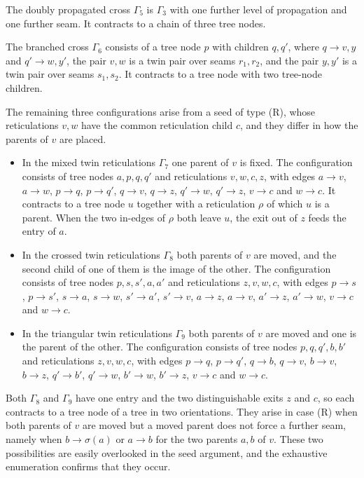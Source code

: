 \documentclass[11pt,a4paper]{article}
\theoremstyle{definition}
\begin{document}
The doubly propagated cross $\Gamma_5$ is $\Gamma_3$ with one further level of propagation and one further seam. It contracts to a chain of three tree nodes.

The branched cross $\Gamma_6$ consists of a tree node $p$ with children $q,q'$, where $q\to v,y$ and $q'\to w,y'$, the pair $v,w$ is a twin pair over seams $r_1,r_2$, and the pair $y,y'$ is a twin pair over seams $s_1,s_2$. It contracts to a tree node with two tree-node children.

The remaining three configurations arise from a seed of type (R), whose reticulations $v,w$ have the common reticulation child $c$, and they differ in how the parents of $v$ are placed.

\begin{itemize}
\item In the mixed twin reticulations $\Gamma_7$ one parent of $v$ is fixed. The configuration consists of tree nodes $a,p,q,q'$ and reticulations $v,w,c,z$, with edges $a\to v$, $a\to w$, $p\to q$, $p\to q'$, $q\to v$, $q\to z$, $q'\to w$, $q'\to z$, $v\to c$ and $w\to c$. It contracts to a tree node $u$ together with a reticulation $\rho$ of which $u$ is a parent. When the two in-edges of $\rho$ both leave $u$, the exit out of $z$ feeds the entry of $a$.
\item In the crossed twin reticulations $\Gamma_8$ both parents of $v$ are moved, and the second child of one of them is the image of the other. The configuration consists of tree nodes $p,s,s',a,a'$ and reticulations $z,v,w,c$, with edges $p\to s$, $p\to s'$, $s\to a$, $s\to w$, $s'\to a'$, $s'\to v$, $a\to z$, $a\to v$, $a'\to z$, $a'\to w$, $v\to c$ and $w\to c$.
\item In the triangular twin reticulations $\Gamma_9$ both parents of $v$ are moved and one is the parent of the other. The configuration consists of tree nodes $p,q,q',b,b'$ and reticulations $z,v,w,c$, with edges $p\to q$, $p\to q'$, $q\to b$, $q\to v$, $b\to v$, $b\to z$, $q'\to b'$, $q'\to w$, $b'\to w$, $b'\to z$, $v\to c$ and $w\to c$.
\end{itemize}

Both $\Gamma_8$ and $\Gamma_9$ have one entry and the two distinguishable exits $z$ and $c$, so each contracts to a tree node of a tree in two orientations. They arise in case (R) when both parents of $v$ are moved but a moved parent does not force a further seam, namely when $b\to\sigma(a)$ or $a\to b$ for the two parents $a,b$ of $v$. These two possibilities are easily overlooked in the seed argument, and the exhaustive enumeration confirms that they occur.
\end{document}
